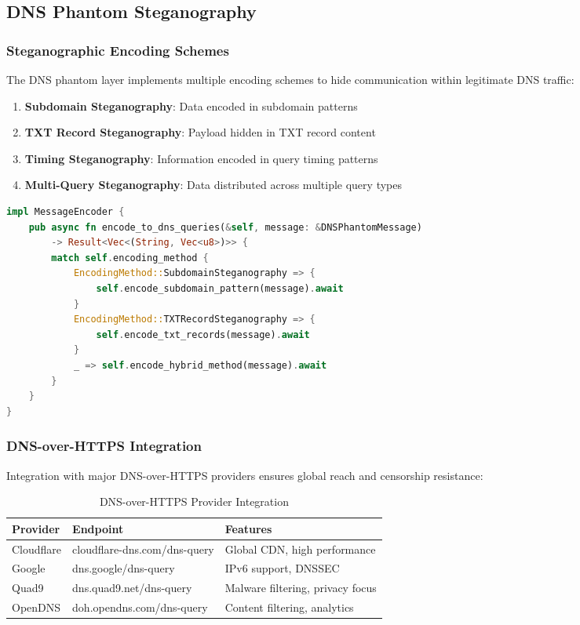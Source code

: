 \documentclass[11pt,a4paper]{article}
\theoremstyle{definition}
\theoremstyle{remark}
\begin{document}
\subsection{DNS Phantom Steganography}

\subsubsection{Steganographic Encoding Schemes}

The DNS phantom layer implements multiple encoding schemes to hide communication within legitimate DNS traffic:

\begin{enumerate}
    \item \textbf{Subdomain Steganography}: Data encoded in subdomain patterns
    \item \textbf{TXT Record Steganography}: Payload hidden in TXT record content
    \item \textbf{Timing Steganography}: Information encoded in query timing patterns
    \item \textbf{Multi-Query Steganography}: Data distributed across multiple query types
\end{enumerate}

\begin{lstlisting}[language=Rust, caption=DNS Steganographic Encoding]
impl MessageEncoder {
    pub async fn encode_to_dns_queries(&self, message: &DNSPhantomMessage) 
        -> Result<Vec<(String, Vec<u8>)>> {
        match self.encoding_method {
            EncodingMethod::SubdomainSteganography => {
                self.encode_subdomain_pattern(message).await
            }
            EncodingMethod::TXTRecordSteganography => {
                self.encode_txt_records(message).await
            }
            _ => self.encode_hybrid_method(message).await
        }
    }
}
\end{lstlisting}

\subsubsection{DNS-over-HTTPS Integration}

Integration with major DNS-over-HTTPS providers ensures global reach and censorship resistance:

\begin{table}[h]
\centering
\begin{tabular}{@{}lll@{}}
\toprule
Provider & Endpoint & Features \\
\midrule
Cloudflare & cloudflare-dns.com/dns-query & Global CDN, high performance \\
Google & dns.google/dns-query & IPv6 support, DNSSEC \\
Quad9 & dns.quad9.net/dns-query & Malware filtering, privacy focus \\
OpenDNS & doh.opendns.com/dns-query & Content filtering, analytics \\
\bottomrule
\end{tabular}
\caption{DNS-over-HTTPS Provider Integration}
\end{table}
\end{document}
